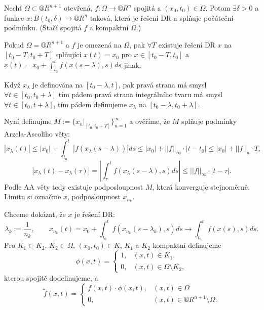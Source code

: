 \documentclass[12pt]{article}					%
\begin{document}
\begin{veta}
	Nechť $\Omega \subset ®R^{n + 1}$ otevřená, $f: \Omega \rightarrow ®R^n$ spojitá a $(x_0, t_0) \in \Omega$. Potom $\exists\delta > 0$ a funkce $x: B(t_0, \delta) \rightarrow ®R^n$ taková, která je řešení DR a splňuje počáteční podmínku. (Stačí spojitá $f$ a kompaktní $\Omega$.)

	\begin{tvrzeni}
		Pokud $\Omega = ®R^{n+1}$ a $f$ je omezená na $\Omega$, pak $\forall T$ existuje řešení DR $x$ na $[t_0 - T, t_0 + T]$ splňující $x(t) = x_0$ pro $x \in [t_0 - T, t_0]$ a $x(t) = x_0 + \int_{t_0}^t f(x(s - \lambda), s) ds$ jinak.

		\begin{dukazin}
			Když $x_{\lambda}$ je definována na $[t_0 - \lambda, t]$, pak pravá strana má smysl $\forall t \in [t_0, t_0 + \lambda]$ tím pádem pravá strana integrálního tvaru má smysl $\forall t \in [t_0, t + \lambda]$, tím pádem definujeme $x_{\lambda}$ na $[t_0 - \lambda, t_0 + \lambda]$.
		\end{dukazin}
	\end{tvrzeni}

	\begin{dukazin}
		Nyní definujme $M := \{x_n|_{[t_0, t_0 + T]}\}_{n=1}^∞$ a ověříme, že $M$ splňuje podmínky Arzela-Ascoliho věty:
		$$ |x_\lambda(t)| ≤ |x_0| + \int_{t_0}^t |f(x_\lambda(s - \lambda))| ds ≤ |x_0| + ||f||_∞ · |t - t_0| ≤ |x_0| + ||f||_a · T, $$
		$$ |x_{\lambda}(t) - x_{\lambda}(\tau)| = \left|\int_\tau^t f(x_\lambda(s - \lambda), s) ds\right| ≤ ||f||_∞·|t - \tau|. $$
		Podle AA věty tedy existuje podposloupnost $M$, která konverguje stejnoměrně. Limitu si označme $x$, podposloupnost $x_{n_k}$.

		Chceme dokázat, že $x$ je řešení DR:
		$$ \lambda_k := \frac{1}{n_k}, \qquad x_{n_k}(t) = x_0 + \int_{t_0}^{t} f(x_{n_k}(s - \lambda_k), s) ds \rightarrow \int_{t_0}^t f(x(s), s) ds. $$
%
%
		Pro $\overline{K_1} \subset K_2$, $\overline{K_2} \subset \Omega$, $(x_0, t_0) \in K$, $K_1$ a $K_2$ kompaktní definujeme
		$$ \phi(x, t) = \begin{cases}1, & (x, t) \in K_1,\\0, & (x, t) \in \Omega \setminus \overline{K_2},\end{cases}$$
		kterou spojitě dodefinujeme, a
		$$ \tilde{f} (x, t) = \begin{cases}f(x, t)·\phi(x, t), & (x, t) \in \Omega \\ 0, & (x, t) \in ®R^{n+1} \setminus \Omega.\end{cases} $$


\end{dukazin}
\end{veta}
\end{document}
